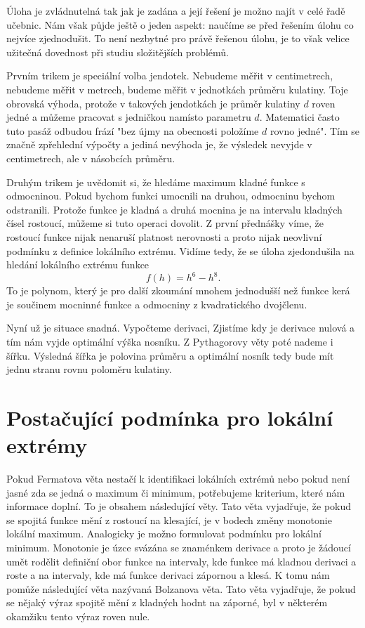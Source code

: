 \documentclass[12pt]{article}
\begin{document}
Úloha je zvládnutelná tak jak je zadána a její řešení je možno najít v celé řadě učebnic. Nám však půjde ještě o jeden aspekt: naučíme se před řešením úlohu co nejvíce zjednodušit. To není nezbytné pro právě řešenou úlohu, je to však velice užitečná dovednost při studiu složitějších problémů.

Prvním trikem je speciální volba jendotek. Nebudeme měřit v centimetrech, nebudeme měřit v metrech, budeme měřit v jednotkách průměru kulatiny. Toje obrovská výhoda, protože v takových jendotkách je průměr kulatiny $d$ roven jedné a můžeme pracovat s jedničkou namísto parametru $d$. Matematici často tuto pasáž odbudou frází "bez újmy na obecnosti položíme $d$ rovno jedné". Tím se značně zpřehlední výpočty a jediná nevýhoda je, že výsledek nevyjde v centimetrech, ale v násobcích průměru.

Druhým trikem je uvědomit si, že hledáme maximum kladné funkce s odmocninou. Pokud bychom funkci umocnili na druhou, odmocninu bychom odstranili. Protože funkce je kladná a druhá mocnina je na intervalu kladných čísel rostoucí, můžeme si tuto operaci dovolit. Z první přednášky víme, že rostoucí funkce nijak nenaruší platnost nerovnosti a proto nijak neovlivní podmínku z definice lokálního extrému. Vidíme tedy, že se úloha zjedondušila na hledání lokálního extrému funkce $$f(h)=h^6-h^8.$$ To je polynom, který je pro další zkoumání mnohem jednodušší než funkce kerá je součinem mocninné funkce a odmocniny z kvadratického dvojčlenu.

Nyní už je situace snadná. Vypočteme derivaci, Zjistíme kdy je derivace nulová a tím nám vyjde optimální výška nosníku. Z Pythagorovy věty poté nademe i šířku. Výsledná šířka je polovina průměru a optimální nosník tedy bude mít jednu stranu rovnu poloměru kulatiny. 


\section*{Postačující podmínka pro lokální extrémy}

Pokud Fermatova věta nestačí k identifikaci lokálních extrémů nebo pokud není jasné zda se jedná o maximum či minimum, potřebujeme kriterium, které nám informace doplní. To je obsahem následující věty. Tato věta vyjadřuje, že pokud se spojitá funkce mění z rostoucí na klesající, je v bodech změny monotonie lokální maximum. Analogicky je možno formulovat podmínku pro lokální minimum. Monotonie je úzce svázána se znaménkem derivace a proto je žádoucí umět rodělit definiční obor funkce na intervaly, kde funkce má kladnou derivaci a roste a na intervaly, kde má funkce derivaci zápornou a klesá. K tomu nám pomůže následující věta nazývaná Bolzanova věta. Tato věta vyjadřuje, že pokud se nějaký výraz spojitě mění z kladných hodnt na záporné, byl v některém okamžiku tento výraz roven nule.
\end{document}
